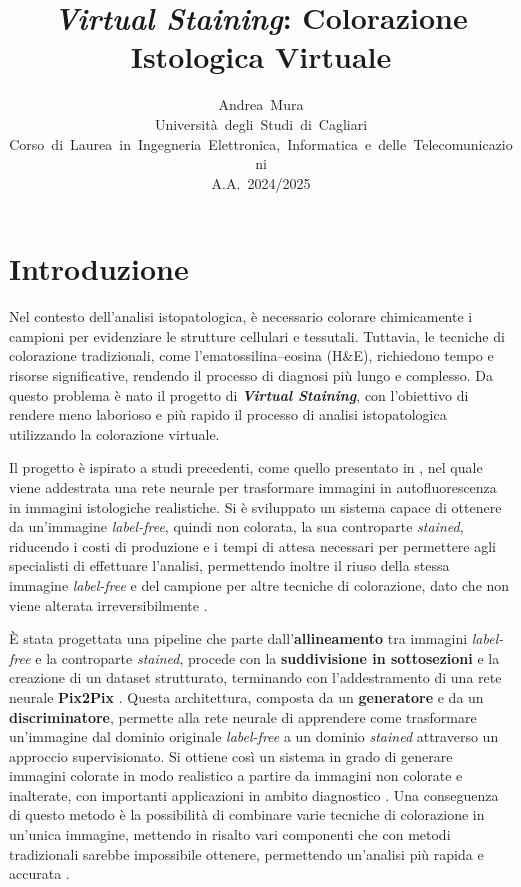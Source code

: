\documentclass[a4paper,10pt]{article}
\title{\textbf{\textit{Virtual Staining}}: Colorazione Istologica Virtuale}
\author{Andrea~Mura\\Università~degli~Studi~di~Cagliari\\Corso~di~Laurea~in~Ingegneria~Elettronica,~Informatica~e~delle~Telecomunicazioni\\A.A.~2024/2025}
\date{}
\begin{document}
\maketitle

\section*{Introduzione}
Nel contesto dell'analisi istopatologica, è necessario colorare chimicamente i campioni per evidenziare le strutture cellulari e tessutali. Tuttavia, le tecniche di colorazione tradizionali, come l'ematossilina--eosina (H\&E), richiedono tempo e risorse significative, rendendo il processo di diagnosi più lungo e complesso. Da questo problema è nato il progetto di \textbf{\textit{Virtual Staining}}, con l'obiettivo di rendere meno laborioso e più rapido il processo di analisi istopatologica utilizzando la colorazione virtuale.

Il progetto è ispirato a studi precedenti, come quello presentato in \cite{rivenson2019}, nel quale viene addestrata una rete neurale per trasformare immagini in autofluorescenza in immagini istologiche realistiche. Si è sviluppato un sistema capace di ottenere da un'immagine \textit{label-free}, quindi non colorata, la sua controparte \textit{stained}, riducendo i costi di produzione e i tempi di attesa necessari per permettere agli specialisti di effettuare l'analisi, permettendo inoltre il riuso della stessa immagine \textit{label-free} e del campione per altre tecniche di colorazione, dato che non viene alterata irreversibilmente \cite{latonen2024}.

\medskip
È stata progettata una pipeline che parte dall'\textbf{allineamento} tra immagini \textit{label-free} e la controparte \textit{stained}, procede con la \textbf{suddivisione in sottosezioni} e la creazione di un dataset strutturato, terminando con l'addestramento di una rete neurale \textbf{Pix2Pix} \cite{isola2017}. Questa architettura, composta da un \textbf{generatore} e da un \textbf{discriminatore}, permette alla rete neurale di apprendere come trasformare un'immagine dal dominio originale \textit{label-free} a un dominio \textit{stained} attraverso un approccio supervisionato. Si ottiene così un sistema in grado di generare immagini colorate in modo realistico a partire da immagini non colorate e inalterate, con importanti applicazioni in ambito diagnostico \cite{lin2025}. Una conseguenza di questo metodo è la possibilità di combinare varie tecniche di colorazione in un'unica immagine, mettendo in risalto vari componenti che con metodi tradizionali sarebbe impossibile ottenere, permettendo un'analisi più rapida e accurata \cite{kawai2024}.
\end{document}
